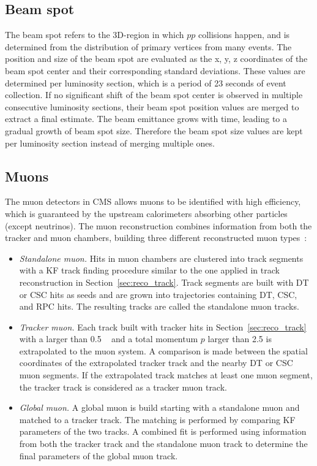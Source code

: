 \subsection{Beam spot}\label{sec:reco_bs}
The beam spot refers to the 3D-region in which $pp$ collisions happen, 
and is determined from the distribution of primary vertices from many events.
The position and size of the beam spot are evaluated as the x, y, z coordinates 
of the beam spot center and their corresponding standard deviations.
These values are determined per luminosity section, which is a period of 23 seconds of event collection.
If no significant shift of the beam spot center is observed in multiple consecutive luminosity sections,
their beam spot position values are merged to extract a final estimate.
The beam emittance grows with time, leading to a gradual growth of beam spot size.
Therefore the beam spot size values are kept per luminosity section instead of merging multiple ones. 

\subsection{Muons}\label{sec:reco_muon}

The muon detectors in CMS allows muons to be identified with high efficiency,
which is guaranteed by the upstream calorimeters absorbing other particles (except neutrinos).
The muon reconstruction combines information from both the tracker and muon chambers, 
building three different reconstructed muon types~\cite{Sirunyan_2018}:
\begin{itemize}
      \item \textit{Standalone muon.} 
            Hits in muon chambers are clustered into track segments with a KF track finding procedure
            similar to the one applied in track reconstruction in Section~\ref{sec:reco_track}.
            Track segments are built with DT or CSC hits as seeds and are grown into trajectories containing DT, CSC, and RPC hits. 
            The resulting tracks are called the standalone muon tracks.
      \item \textit{Tracker muon.}
            Each track built with tracker hits in Section~\ref{sec:reco_track} with a \pt larger than 0.5 ~\GeV 
            and a total momentum $p$ larger than 2.5 \GeV is extrapolated to the muon system.
            A comparison is made between the spatial coordinates of the extrapolated tracker track and the nearby DT or CSC muon segments.
            If the extrapolated track matches at least one muon segment,
            the tracker track is considered as a tracker muon track.
      \item \textit{Global muon.}
            A global muon is build starting with a standalone muon and matched to a tracker track.
            The matching is performed by comparing KF parameters of the two tracks.
            A combined fit is performed using information from both the tracker track and the standalone muon track
            to determine the final parameters of the global muon track. 
\end{itemize}

